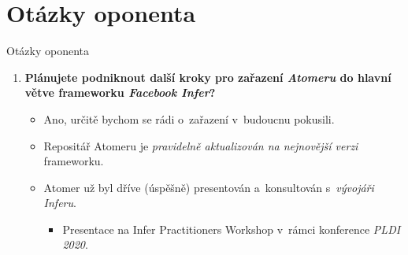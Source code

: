 \documentclass[10pt, xcolor=pdflatex, hyperref={unicode}, aspectratio=169]{beamer}
\begin{document}


\appendix




\section{Otázky oponenta}
\begin{frame}{Otázky oponenta}
    \begin{enumerate}
        \item \textbf{Plánujete podniknout další kroky pro zařazení \emph{Atomeru} do \alert{hlavní větve} frameworku \emph{Facebook Infer}?}
            \bigskip
            \begin{itemize}\setlength\itemsep{1.5em}
                \item \alert{Ano}, určitě bychom se rádi o~zařazení v~budoucnu pokusili. 

                \item Repositář Atomeru je \emph{pravidelně aktualizován na nejnovější verzi} frameworku.

                \item Atomer už byl dříve (úspěšně) \alert{presentován} a~\alert{konsultován} s~\emph{vývojáři Inferu}.
                    \medskip
                    \begin{itemize}
                        \item Presentace na \alert{Infer Practitioners Workshop} v~rámci konference \emph{PLDI 2020}.
                    \end{itemize}
            \end{itemize}
    \end{enumerate}
\end{frame}


\end{document}
